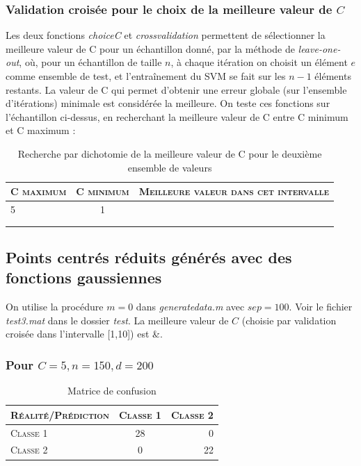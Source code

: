 \documentclass{article}
\begin{document}
\subsubsection{Validation croisée pour le choix de la meilleure valeur de $C$}

Les deux fonctions \emph{choiceC} et \emph{crossvalidation} permettent de sélectionner la meilleure valeur de C pour un échantillon donné, par la méthode de \emph{leave-one-out}, où, pour un échantillon de taille $n$, à chaque itération on choisit un élément $e$ comme ensemble de test, et l'entraînement du SVM se fait sur les $n-1$ éléments restants. La valeur de C qui permet d'obtenir une erreur globale (sur l'ensemble d'itérations) minimale est considérée la meilleure. On teste ces fonctions sur l'échantillon ci-dessus, en recherchant la meilleure valeur de C entre C minimum et C maximum :\\

     \begin{table}[H]
       \caption{Recherche par dichotomie de la meilleure valeur de C pour le deuxième ensemble de valeurs}
       \begin{tabular}{|l|c|r|}
         \hline
         \textsc{C maximum} & \textsc{C minimum} & \textsc{Meilleure valeur dans cet intervalle}\\
         \hline
         5 & 1 & \\
         \hline
          &  & \\
         \hline
          &  & \\
         \hline
       \end{tabular}
     \end{table}

\subsection{Points centrés réduits générés avec des fonctions gaussiennes}

On utilise la procédure $m = 0$ dans \emph{generatedata.m} avec $sep=100$. Voir le fichier \emph{test3.mat} dans le dossier \emph{test}. La meilleure valeur de $C$ (choisie par validation croisée dans l'intervalle [1,10]) est &.

\subsubsection{Pour $C=5, n=150, d=200$}

     \begin{table}[H]
       \caption{Matrice de confusion}
       \begin{tabular}{|l|c|r|}
         \hline
         \textsc{Réalité/Prédiction} & \textsc{Classe 1} & \textsc{Classe 2}\\
         \hline
         \textsc{Classe 1} & 28 & 0\\
         \hline
         \textsc{Classe 2} & 0 & 22\\
         \hline
       \end{tabular}
     \end{table}
\end{document}
